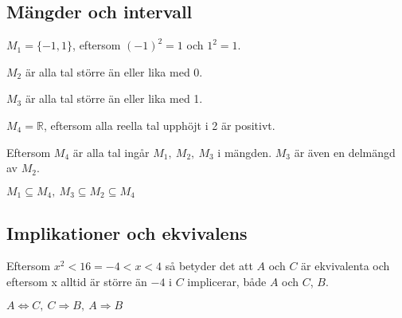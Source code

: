 \subsection*{Mängder och intervall}

\begin{task}{1.3}
	$M_1=\{-1,1\}$, eftersom $(-1)^2=1$ och $1^2=1$.
	
	$M_2$ är alla tal större än eller lika med 0.
	
	$M_3$ är alla tal större än eller lika med 1.
	
	$M_4=\mathbb{R}$, eftersom alla reella tal upphöjt i 2 är positivt.
	
	Eftersom $M_4$ är alla tal ingår $M_1,~M_2,~M_3$ i mängden. $M_3$ är även en delmängd av $M_2$.
	
	\ans $M_1 \subseteq M_4,~ M_3 \subseteq M_2 \subseteq M_4$
\end{task}

\subsection*{Implikationer och ekvivalens}

\begin{task}{1.4}
	Eftersom $x^2<16 = -4<x<4$ så betyder det att $A$ och $C$ är ekvivalenta och
	eftersom x alltid är större än $-4$ i $C$ implicerar, både $A$ och $C$, $B$.
	
	\ans $A \Leftrightarrow C,~ C \Rightarrow B,~ A \Rightarrow B$
\end{task}